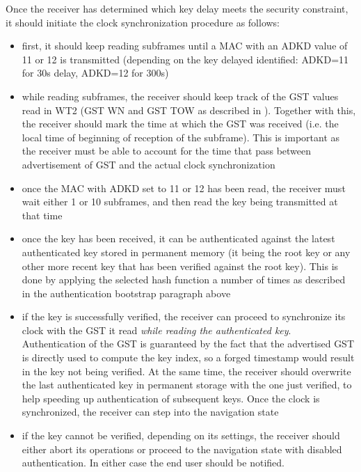 Once the receiver has determined which key delay meets the security constraint,
it should initiate the clock synchronization procedure as follows:
\begin{itemize}
  \item first, it should keep reading subframes until a MAC with an ADKD value
    of 11 or 12 is transmitted (depending on the key delayed identified:
    \textrm{ADKD=11} for \num{30}\si{s} delay, \textrm{ADKD=12} for
    \num{300}\si{s})
  \item while reading subframes, the receiver should keep track of the GST
    values read in WT2 (GST WN and GST TOW as described in \cite{galileoicd}).
    Together with this, the receiver should mark the time at which the GST was
    received (i.e. the local time of beginning of reception of the subframe).
    This is important as the receiver must be able to account for the time that
    pass between advertisement of GST and the actual clock synchronization
  \item once the MAC with ADKD set to 11 or 12 has been read, the receiver must
    wait either 1 or 10 subframes, and then read the key being transmitted at
    that time
  \item once the key has been received, it can be authenticated against the
    latest authenticated key stored in permanent memory (it being the root key
    or any other more recent key that has been verified against the root key).
    This is done by applying the selected hash function a number of times as
    described in the authentication bootstrap paragraph above
  \item if the key is successfully verified, the receiver can proceed to
    synchronize its clock with the GST it read \textit{while reading the
    authenticated key}. Authentication of the GST is guaranteed by the fact that
    the advertised GST is directly used to compute the key index, so a forged
    timestamp would result in the key not being verified. At the same time, the
    receiver should overwrite the last authenticated key in permanent storage
    with the one just verified, to help speeding up authentication of subsequent
    keys. Once the clock is synchronized, the receiver can step into the
    navigation state
  \item if the key cannot be verified, depending on its settings, the receiver
    should either abort its operations or proceed to the navigation state with
    disabled authentication. In either case the end user should be notified.
\end{itemize}

